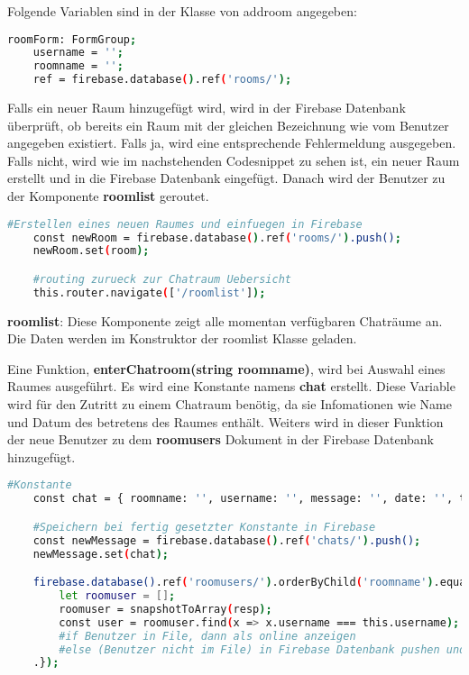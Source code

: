 Folgende Variablen sind in der Klasse von addroom angegeben:

\begin{lstlisting}[language=bash]
    roomForm: FormGroup;
    username = '';
    roomname = '';
    ref = firebase.database().ref('rooms/');
\end{lstlisting}

Falls ein neuer Raum hinzugefügt wird, wird in der Firebase Datenbank überprüft, ob bereits ein Raum mit der gleichen Bezeichnung wie vom Benutzer angegeben existiert. Falls ja, wird eine entsprechende Fehlermeldung ausgegeben. Falls
nicht, wird wie im nachstehenden Codesnippet zu sehen ist, ein neuer Raum erstellt und in die Firebase Datenbank eingefügt. Danach wird der Benutzer zu der Komponente \textbf{roomlist} geroutet.

\begin{lstlisting}[language=bash]
    #Erstellen eines neuen Raumes und einfuegen in Firebase
    const newRoom = firebase.database().ref('rooms/').push();
    newRoom.set(room);

    #routing zurueck zur Chatraum Uebersicht
    this.router.navigate(['/roomlist']);
\end{lstlisting}

\textbf{roomlist}: Diese Komponente zeigt alle momentan verfügbaren Chaträume an. Die Daten werden im Konstruktor der roomlist Klasse geladen.

Eine Funktion, \textbf{enterChatroom(string roomname)}, wird bei Auswahl eines Raumes ausgeführt. Es wird eine Konstante namens \textbf{chat} erstellt. Diese Variable wird für den Zutritt zu einem Chatraum benötig, da sie 
Infomationen wie Name und Datum des betretens des Raumes enthält. Weiters wird in dieser Funktion der neue Benutzer zu dem \textbf{roomusers} Dokument in der Firebase Datenbank hinzugefügt.

\begin{lstlisting}[language=bash]
    #Konstante
    const chat = { roomname: '', username: '', message: '', date: '', type: '' };

    #Speichern bei fertig gesetzter Konstante in Firebase
    const newMessage = firebase.database().ref('chats/').push();
    newMessage.set(chat);

    firebase.database().ref('roomusers/').orderByChild('roomname').equalTo(roomname).on('value', (resp: any) => {
        let roomuser = [];
        roomuser = snapshotToArray(resp);
        const user = roomuser.find(x => x.username === this.username);
        #if Benutzer in File, dann als online anzeigen
        #else (Benutzer nicht im File) in Firebase Datenbank pushen und als online anzeigen
    .});
\end{lstlisting}

